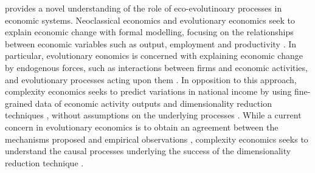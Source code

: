 % 
\chapiii provides a novel understanding of the role of eco-evolutinoary processes in economic systems. %
% 
% 
Neoclassical economics and evolutionary economics seek to explain economic change with formal modelling, focusing on the relationships between economic variables such as output, employment and productivity \citep{Boschma2005a}.
% 
% 
In particular, evolutionary eonomics is concerned with explaining economic change by endogenous forces, such as interactions between firms and economic activities, and evolutionary processes acting upon them \citep{Hodgson2019,Metcalfe2006}.
% 
% 
In opposition to this approach, complexity economics \citep{Hidalgo2021} seeks to predict variations in national income by using fine-grained data of economic activity outputs and dimensionality reduction techniques \citep{Mitchell}, without assumptions on the underlying processes \citep{Hidalgo}. 
% 
%
While a current concern in evolutionary economics is to obtain an agreement between the mechanisms proposed and empirical observations \xxx, complexity economics seeks to understand the causal processes underlying the success of the dimensionality reduction technique \xxx.

